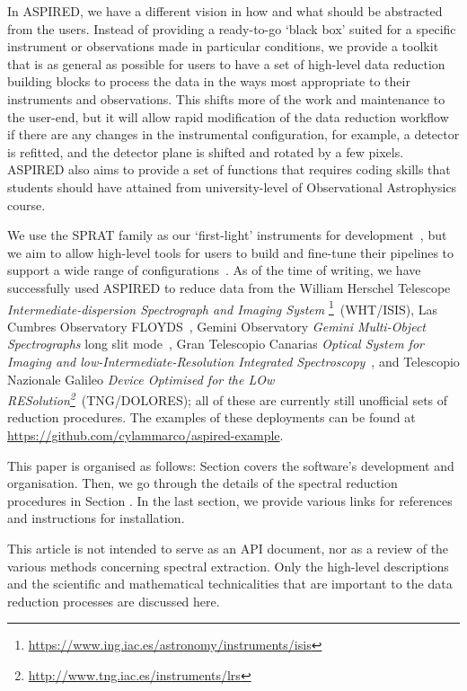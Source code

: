 \documentclass[fleqn,usenatbib]{mnras}
\begin{document}
In \textsc{ASPIRED}, we have a different vision in how and what should be abstracted from the
users. Instead of providing a ready-to-go `black box' suited for a specific instrument
or observations made in particular conditions, we provide a toolkit that is as general
as possible for users to have a set of high-level data reduction building blocks to
process the data in the ways most appropriate to their instruments and observations.
This shifts more of the work and maintenance to the user-end, but it will allow rapid
modification of the data reduction workflow if there are any changes in the instrumental
configuration, for example, a detector is refitted, and the detector plane is shifted and
rotated by a few pixels. \textsc{ASPIRED} also aims to provide a set of functions that requires
coding skills that students  should have attained from university-level of Observational
Astrophysics course.

We use the SPRAT family as our `first-light' instruments for development~\citep{2014SPIE.9147E..8HP},
but we aim to allow high-level tools for users to build and fine-tune their pipelines to support
a wide range of configurations~\citep{2020arXiv201203505L, marco_2021_4463569}. As of the time of
writing, we have successfully used \textsc{ASPIRED} to reduce data from the William Herschel Telescope
\textit{Intermediate-dispersion Spectrograph and Imaging System}
\footnote{\url{https://www.ing.iac.es/astronomy/instruments/isis}}~(WHT/ISIS), Las Cumbres
Observatory FLOYDS~\citep[LCO/FLOYDS]{2013PASP..125.1031B}, Gemini Observatory
\textit{Gemini Multi-Object Spectrographs} long slit
mode~\citep[Gemini/GMOS-LS]{2004PASP..116..425H}, Gran Telescopio Canarias \textit{Optical
System for Imaging and low-Intermediate-Resolution Integrated
Spectroscopy}~\citep[GTC/OSIRIS]{2000SPIE.4008..623C}, and Telescopio Nazionale Galileo
\textit{Device Optimised for the LOw
RESolution\footnote{\url{http://www.tng.iac.es/instruments/lrs}}}~(TNG/DOLORES); all of
these are currently still unofficial sets of reduction procedures. The examples of these deployments can be
found at \url{https://github.com/cylammarco/aspired-example}.

This paper is organised as follows: Section  covers the software's development and
organisation. Then, we go through the details of the spectral reduction
procedures in Section . In the last section, we provide various links
for references and instructions for installation.

This article is not intended to serve as an API document, nor as a review of the
various methods concerning spectral extraction. Only the high-level
descriptions and the scientific and mathematical technicalities that are
important to the data reduction processes are discussed here.
\end{document}
